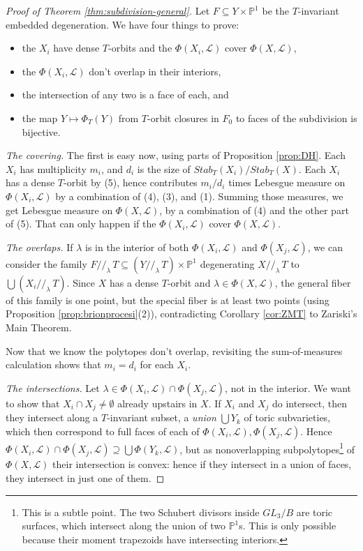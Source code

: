 \documentclass[10pt,a4paper]{amsart}
\newcommand{\PP}{\mathbb{P}}
\newcommand\Union\bigcup
\newcommand\calL{{\mathcal L}}
\begin{document}
\begin{proof}[Proof of Theorem \ref{thm:subdivision-general}]
  Let $F \subseteq Y \times \PP^1$ be the $T$-invariant embedded degeneration.
  We have four things to prove:
  \begin{itemize}
  \item the $X_i$ have dense $T$-orbits and the $\Phi(X_i,\calL)$
    cover $\Phi(X,\calL)$,
  \item the $\Phi(X_i,\calL)$ don't overlap in their interiors, 
  \item the intersection of any two is a face of each, and
  \item the map $Y \mapsto \Phi_T(Y)$ from $T$-orbit closures in $F_0$
    to faces of the subdivision is bijective.
  \end{itemize}

  {\em The covering.}
  The first is easy now, using parts of Proposition \ref{prop:DH}. Each $X_i$ has multiplicity $m_i$, and $d_i$ is the size of  $Stab_T(X_i)/Stab_T(X)$. 
  Each $X_i$ has a dense $T$-orbit by (5), hence contributes $m_i/d_i$ times
  Lebesgue measure on $\Phi(X_i, \calL)$ by a combination of (4), (3), and (1).
  Summing those measures, we get Lebesgue measure on $\Phi(X,\calL)$,
  by a combination of (4) and the other part of (5). That can only happen
  if the $\Phi(X_i,\calL)$ cover $\Phi(X,\calL)$.

  {\em The overlaps.}
  If $\lambda$ is in the interior of both $\Phi(X_i,\calL)$ and $\Phi(X_j,\calL)$,
  we can consider the family
  $F//_\lambda\, T \subseteq (Y//_\lambda\, T) \times \PP^1$ degenerating
  $X//_\lambda\, T$ to $\Union (X_i //_\lambda\, T)$. Since $X$ has a dense
  $T$-orbit and $\lambda \in \Phi(X,\calL)$, the general fiber of this family
  is one point, but the special fiber is at least two points
  (using Proposition \ref{prop:brionprocesi}(2)),
  contradicting Corollary \ref{cor:ZMT} to Zariski's Main Theorem.

  Now that we know the polytopes don't overlap, revisiting the
  sum-of-measures calculation shows that $m_i = d_i$ for each $X_i$.

  {\em The intersections.}
  Let $\lambda \in \Phi(X_i,\calL) \cap \Phi(X_j,\calL)$, not in
  the interior. We want to show that $X_i\cap X_j \neq \emptyset$
  already upstairs in $X$. If $X_i$ and $X_j$ do intersect, then they intersect
  along a $T$-invariant subset, a {\em union} $\Union Y_k$
  of toric subvarieties, which then correspond to full faces of each of
  $\Phi(X_i,\calL), \Phi(X_j,\calL)$.
  Hence $\Phi(X_i,\calL) \cap \Phi(X_j,\calL) \supseteq \Union \Phi(Y_k,\calL)$,
  but as nonoverlapping subpolytopes\footnote{This is a subtle point.
    The two Schubert divisors inside $GL_3/B$ are toric surfaces,
    which intersect along the union of two $\PP^1$s. This is only
    possible because their moment trapezoids have intersecting interiors.}
  of $\Phi(X,\calL)$ their intersection is convex: hence if they
  intersect in a union of faces, they intersect in just one of them.


\end{proof}
\end{document}
